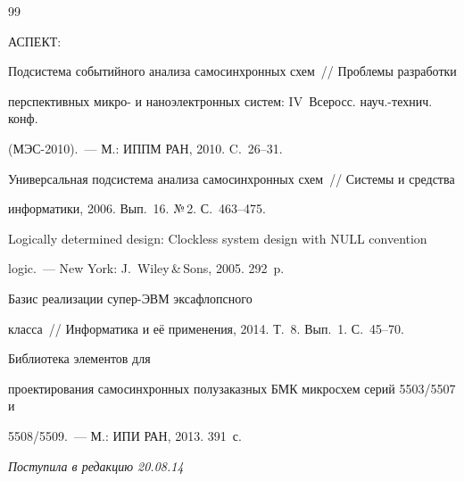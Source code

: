 {{\begin{thebibliography}{99}

 АСПЕКТ:

Подсистема событийного анализа самосинхронных схем~/\!\!/ Проблемы разработки

перспективных микро- и наноэлектронных систем: IV~Всеросс. науч.-технич. конф.

(МЭС-2010).~--- М.: ИППМ РАН, 2010. C.~26--31.



Универсальная подсистема анализа самосинхронных схем~/\!\!/ Системы и средства

информатики, 2006. Вып.~16. №\,2. С.~463--475.


 Logically determined design: Clockless system design with NULL convention

logic.~--- New York: J.~Wiley\,\&\,Sons, 2005. 292~p.


 Базис реализации су\-пер-ЭВМ эксафлопсного

класса~/\!\!/ Информатика и её применения, 2014. Т.~8. Вып.~1. С.~45--70.




 Библиотека элементов для

проектирования самосинхронных полузаказных БМК микросхем серий 5503/5507 и

5508/5509.~--- М.: ИПИ РАН, 2013. 391~с.

\end{thebibliography}

} }





\vspace*{-6pt}



\hfill{\small\textit{Поступила в редакцию 20.08.14}}








